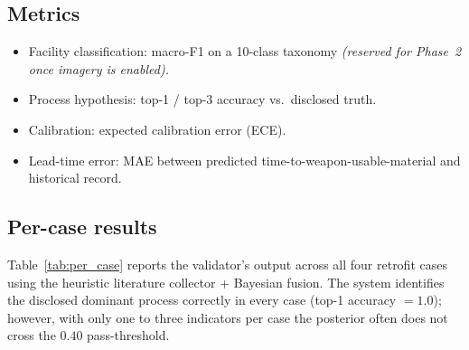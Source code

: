 \documentclass[11pt,a4paper]{article}
\begin{document}
\subsection{Metrics}
\begin{itemize}[leftmargin=*,itemsep=2pt]
  \item Facility classification: macro-F1 on a 10-class taxonomy
        \emph{(reserved for Phase~2 once imagery is enabled).}
  \item Process hypothesis: top-1 / top-3 accuracy vs.\ disclosed truth.
  \item Calibration: expected calibration error (ECE).
  \item Lead-time error: MAE between predicted
        time-to-weapon-usable-material and historical record.
\end{itemize}

\subsection{Per-case results}\label{sec:results}

Table~\ref{tab:per_case} reports the validator's output across all four
retrofit cases using the heuristic literature collector + Bayesian
fusion. The system identifies the disclosed dominant process correctly
in every case (top-1 accuracy $= 1.0$); however, with only one to three
indicators per case the posterior often does not cross the
$0.40$ pass-threshold.
\end{document}

